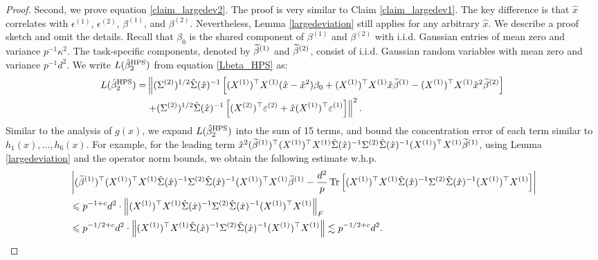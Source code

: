 \begin{proof}
Second, we prove equation \eqref{claim_largedev2}.
The proof is very similar to Claim \ref{claim_largedev1}.
The key difference is that $\hat x$ correlates with $\epsilon^{(1)}$, $\epsilon^{(2)}$, $\beta^{(1)}$, and $\beta^{(2)}$.
Nevertheless, Lemma \ref{largedeviation} still applies for any arbitrary $\hat x$.
We describe a proof sketch and omit the details.
Recall that $\beta_0$ is the shared component of $\beta^{(1)}$ and $\beta^{(2)}$ with i.i.d. Gaussian entries of mean zero and variance $p^{-1}\kappa^2$.
The task-specific components, denoted by $\widetilde\beta^{(1)}$ and $\widetilde\beta^{(2)}$, consist of i.i.d. Gaussian random variables with mean zero and variance $p^{-1} d^2$.
We write $L(\hat{\beta}_2^{\textup{HPS}}) $ from equation \eqref{Lbeta_HPS} as:
\begin{align}
L(\hat{\beta}_2^{\textup{HPS}})  =&  \left\| (\Sigma^{(2)})^{1/2}\hat \Sigma(\hat x)^{-1} \left[(X^{(1)})^\top X^{(1)} (\hat x -\hat x^2)\beta_0+(X^{(1)})^\top X^{(1)} \hat x\widetilde \beta^{(1)} - (X^{(1)})^\top X^{(1)}  \hat x^2\widetilde \beta^{(2)} \right] \right. \nonumber\\
&\left. + (\Sigma^{(2)})^{1/2}\hat \Sigma(\hat x)^{-1}\left[ (X^{(2)})^\top \varepsilon^{(2)} + \hat x   (X^{(1)})^\top \varepsilon^{(1)} \right]\right\|^2. \label{expand_15}
\end{align}
Similar to the analysis of $g(x)$, we expand $L(\hat{\beta}_2^{\textup{HPS}})$ into the sum of 15 terms, and bound the concentration error of each term similar to $h_1(x), \dots, h_6(x)$.
For example, for the leading term $\hat x^2 (\widetilde \beta^{(1)})^\top (X^{(1)})^\top X^{(1)} \hat \Sigma(\hat x)^{-1}  \Sigma^{(2)} \hat \Sigma(\hat x)^{-1}  (X^{(1)})^\top X^{(1)}\widetilde\beta^{(1)}$, using
Lemma \ref{largedeviation} and the operator norm bounds, we obtain the following estimate w.h.p.
\begin{align*}
&  \left| (\widetilde \beta^{(1)})^\top (X^{(1)})^\top X^{(1)} \hat \Sigma(\hat x)^{-1}  \Sigma^{(2)} \hat \Sigma(\hat x)^{-1}  (X^{(1)})^\top X^{(1)}\widetilde\beta^{(1)} - \frac{d^2}{p}\operatorname{Tr}\left[(X^{(1)})^\top X^{(1)} \hat \Sigma(\hat x)^{-1}  \Sigma^{(2)} \hat \Sigma(\hat x)^{-1}  (X^{(1)})^\top X^{(1)}\right]\right| \\
&\leqslant p^{-1+c}d^2 \cdot \left\| (X^{(1)})^\top X^{(1)} \hat \Sigma(\hat x)^{-1}  \Sigma^{(2)} \hat \Sigma(\hat x)^{-1}  (X^{(1)})^\top X^{(1)} \right\|_F \\
&\leqslant p^{-1/2+c}d^2 \cdot  \left\| (X^{(1)})^\top X^{(1)} \hat \Sigma(\hat x)^{-1}  \Sigma^{(2)} \hat \Sigma(\hat x)^{-1}  (X^{(1)})^\top X^{(1)} \right\|  \lesssim p^{-1/2+c}d^2.
\end{align*} 

\end{proof}
